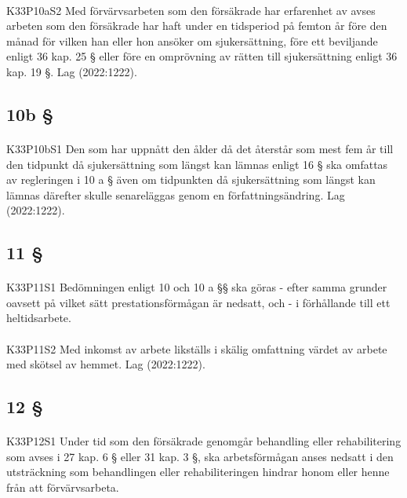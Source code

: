 \documentclass[a4paper,notitlepage,openany,10pt]{book}
\begin{document}
\paragraph*{}
{\tiny K33P10aS2}
Med förvärvsarbeten som den försäkrade har erfarenhet av avses arbeten som den försäkrade har haft under en tidsperiod på femton år före den månad för vilken han eller hon ansöker om sjukersättning, före ett beviljande enligt 36 kap. 25 § eller före en omprövning av rätten till sjukersättning enligt 36 kap. 19 §.
Lag (2022:1222).
\subsection*{10b §}
\paragraph*{}
{\tiny K33P10bS1}
Den som har uppnått den ålder då det återstår som mest fem år till den tidpunkt då sjukersättning som längst kan lämnas enligt 16 § ska omfattas av regleringen i 10 a § även om tidpunkten då sjukersättning som längst kan lämnas därefter skulle senareläggas genom en författningsändring.
Lag (2022:1222).
\subsection*{11 §}
\paragraph*{}
{\tiny K33P11S1}
Bedömningen enligt 10 och 10 a §§ ska göras
\newline - efter samma grunder oavsett på vilket sätt prestationsförmågan är nedsatt, och
\newline - i förhållande till ett heltidsarbete.
\paragraph*{}
{\tiny K33P11S2}
Med inkomst av arbete likställs i skälig omfattning värdet av arbete med skötsel av hemmet.
Lag (2022:1222).
\subsection*{12 §}
\paragraph*{}
{\tiny K33P12S1}
Under tid som den försäkrade genomgår behandling eller rehabilitering som avses i 27 kap. 6 § eller 31 kap. 3 §, ska arbetsförmågan anses nedsatt i den utsträckning som behandlingen eller rehabiliteringen hindrar honom eller henne från att förvärvsarbeta.
\end{document}
